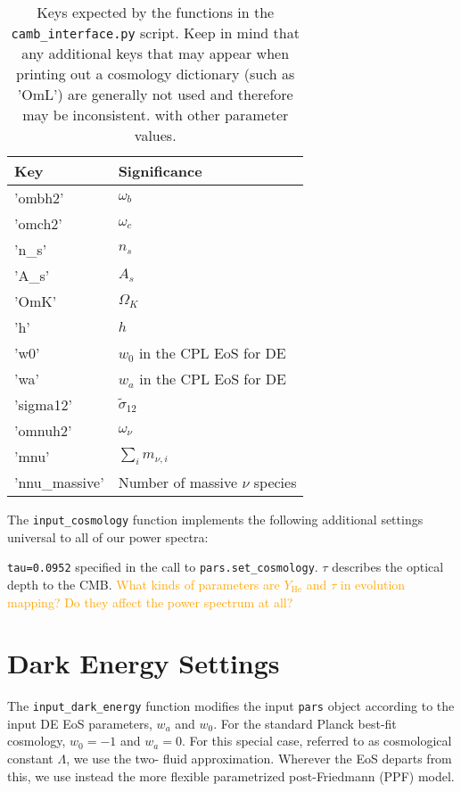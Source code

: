 \begin{table}[ht!]
\centering
\begin{tabular}{l|l}
\hline
Key & Significance \\ \hline
'ombh2' & $\omega_b$ \\
'omch2' & $\omega_c$ \\
'n\_s' & $n_s$ \\
'A\_s' & $A_s$ \\
'OmK' & $\Omega_K$ \\
'h' & $h$ \\
'w0' & $w_0$ in the CPL EoS for DE \\
'wa' & $w_a$ in the CPL EoS for DE \\
'sigma12' & $\tilde{\sigma}_{12}$\footnotemark \\
'omnuh2' & $\omega_\nu$ \\
'mnu' & $\sum_i m_{\nu, i}$ \\
'nnu\_massive' & Number of massive $\nu$ species \\ \hline
\end{tabular}
 \cprotect\caption[Cosmology Dictionary Keys]{Keys
 	expected by the functions in
 	the \verb|camb_interface.py| script. Keep in mind that any additional
 	keys that may appear when printing out a cosmology dictionary
 	(such as 'OmL') are generally not used and therefore may be inconsistent.
 	with other parameter values.}
 \label{tab: cosmology_dictionary}
\end{table}
 	

The \verb|input_cosmology| function implements the following additional
settings universal to all of our power spectra:

\verb|tau=0.0952| \quad specified in the call to \verb|pars.set_cosmology|.
$\tau$ describes the optical depth to the CMB. \textcolor{orange}{What kinds 
of parameters are $Y_\text{He}$ and $\tau$ in evolution mapping?
Do they affect the power spectrum at all?}


\section{Dark Energy Settings}

The \verb|input_dark_energy| function modifies the input \verb|pars| object
according to the input DE EoS parameters, $w_a$ and $w_0$. For the standard
Planck best-fit cosmology, $w_0 = -1$ and $w_a = 0$. For this special case,
referred to as cosmological constant $\Lambda$, we use the two-
fluid approximation. Wherever the EoS departs from this, we use instead the
more flexible parametrized post-Friedmann (PPF) model.

